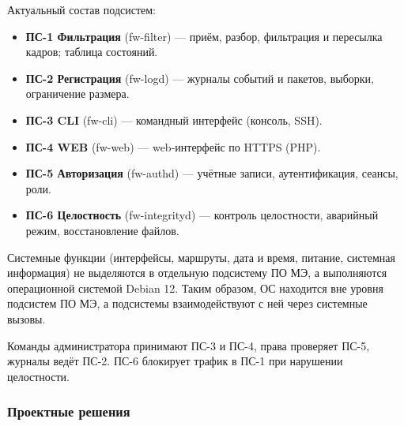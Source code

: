 \documentclass[13pt,a4paper,final]{article}
\begin{document}
	Актуальный состав подсистем:
	\begin{itemize}
		\item \textbf{ПС-1 Фильтрация} (fw-filter) — приём, разбор, фильтрация и пересылка кадров; таблица состояний.
		\item \textbf{ПС-2 Регистрация} (fw-logd) — журналы событий и пакетов, выборки, ограничение размера.
		\item \textbf{ПС-3 CLI} (fw-cli) — командный интерфейс (консоль, SSH).
		\item \textbf{ПС-4 WEB} (fw-web) — web-интерфейс по HTTPS (PHP).
		\item \textbf{ПС-5 \textcolor{edit}{Авторизация}} (fw-authd) — учётные записи, аутентификация, сеансы, роли.
		\item \textbf{ПС-6 Целостность} (fw-integrityd) — контроль целостности, аварийный режим, восстановление файлов.
	\end{itemize}
	
	Системные функции (интерфейсы, маршруты, дата и время, питание, системная информация) не выделяются в отдельную подсистему ПО МЭ, а выполняются операционной системой Debian 12. Таким образом, ОС находится вне уровня подсистем ПО МЭ, а подсистемы взаимодействуют с ней через системные вызовы.
	
	Команды администратора принимают ПС-3 и ПС-4, права проверяет ПС-5, журналы ведёт ПС-2. ПС-6 блокирует трафик в ПС-1 при нарушении целостности.
	
	\subsubsection{Проектные решения}
	
\end{document}
